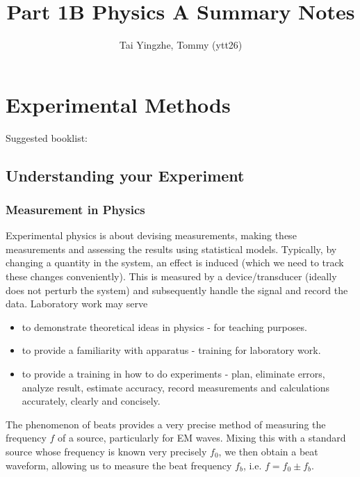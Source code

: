 \documentclass[a4paper]{article}
\title{\textbf{Part 1B Physics A Summary Notes}}
\author{Tai Yingzhe, Tommy (ytt26)}
\date{}
\begin{document}
\maketitle
\tableofcontents
\newpage
\section{Experimental Methods}
Suggested booklist: \cite{ahmed_spreadbury_1984, 10.5555/2960712,squires_2001,dunlap1988experimental,hughes2010measurements}
\subsection{Understanding your Experiment}
\subsubsection*{Measurement in Physics}
\begin{Note}
Experimental physics is about devising measurements, making these measurements and assessing the results using statistical models. Typically, by changing a quantity in the system, an effect is induced (which we need to track these changes conveniently). This is measured by a device/transducer (ideally does not perturb the system) and subsequently handle the signal and record the data. Laboratory work may serve
\begin{itemize}
    \item to demonstrate theoretical ideas in physics - for teaching purposes. 
    \item to provide a familiarity with apparatus - training for laboratory work.
    \item to provide a training in how to do experiments - plan, eliminate errors, analyze result, estimate accuracy, record measurements and calculations accurately, clearly and concisely.
\end{itemize}
\end{Note}
\begin{Note}
The phenomenon of beats provides a very precise method of measuring the frequency $f$ of a source, particularly for EM waves. Mixing this with a standard source whose frequency is known very precisely $f_0$, we then obtain a beat waveform, allowing us to measure the beat frequency $f_b$, i.e. $f=f_0\pm f_b$.~\cite{squires_2001}
\end{Note}
\end{document}
